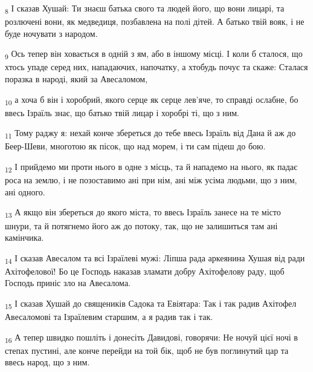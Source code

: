 \begin{tcolorbox}
\textsubscript{8} І сказав Хушай: Ти знаєш батька свого та людей його, що вони лицарі, та розлючені вони, як медведиця, позбавлена на полі дітей. А батько твій вояк, і не буде ночувати з народом.
\end{tcolorbox}
\begin{tcolorbox}
\textsubscript{9} Ось тепер він ховається в одній з ям, або в іншому місці. І коли б сталося, що хтось упаде серед них, нападаючих, напочатку, а хтобудь почує та скаже: Сталася поразка в народі, який за Авесаломом,
\end{tcolorbox}
\begin{tcolorbox}
\textsubscript{10} а хоча б він і хоробрий, якого серце як серце лев'яче, то справді ослабне, бо ввесь Ізраїль знає, що батько твій лицар і хоробрі ті, що з ним.
\end{tcolorbox}
\begin{tcolorbox}
\textsubscript{11} Тому раджу я: нехай конче збереться до тебе ввесь Ізраїль від Дана й аж до Беер-Шеви, многотою як пісок, що над морем, і ти сам підеш до бою.
\end{tcolorbox}
\begin{tcolorbox}
\textsubscript{12} І прийдемо ми проти нього в одне з місць, та й нападемо на нього, як падає роса на землю, і не позоставимо ані при нім, ані між усіма людьми, що з ним, ані одного.
\end{tcolorbox}
\begin{tcolorbox}
\textsubscript{13} А якщо він збереться до якого міста, то ввесь Ізраїль занесе на те місто шнури, та й потягнемо його аж до потоку, так, що не залишиться там ані камінчика.
\end{tcolorbox}
\begin{tcolorbox}
\textsubscript{14} І сказав Авесалом та всі Ізраїлеві мужі: Ліпша рада аркеянина Хушая від ради Ахітофелової! Бо це Господь наказав зламати добру Ахітофелову раду, щоб Господь приніс зло на Авесалома.
\end{tcolorbox}
\begin{tcolorbox}
\textsubscript{15} І сказав Хушай до священиків Садока та Евіятара: Так і так радив Ахітофел Авесаломові та Ізраїлевим старшим, а я радив так і так.
\end{tcolorbox}
\begin{tcolorbox}
\textsubscript{16} А тепер швидко пошліть і донесіть Давидові, говорячи: Не ночуй цієї ночі в степах пустині, але конче перейди на той бік, щоб не був поглинутий цар та ввесь народ, що з ним.
\end{tcolorbox}
